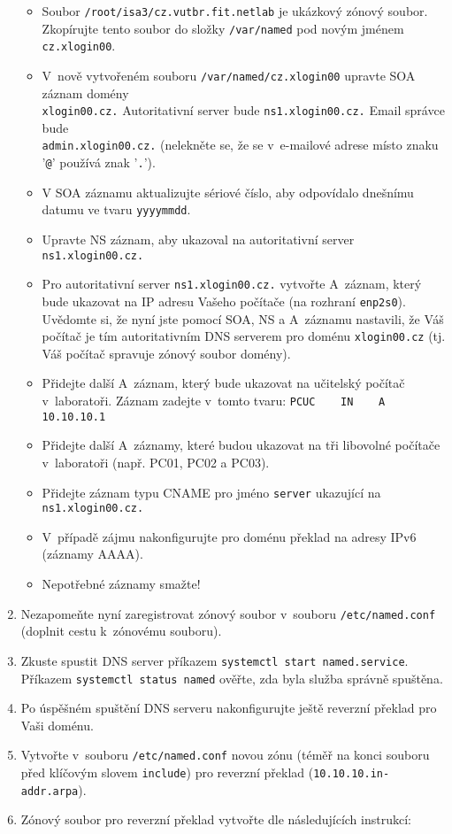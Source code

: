 \begin{enumerate}
    \begin{itemize}
      \item Soubor {\tt /root/isa3/cz.vutbr.fit.netlab} je ukázkový zónový soubor.\\
            Zkopírujte tento soubor do složky {\tt /var/named} pod novým jménem {\tt cz.xlogin00}.
      \item V~nově vytvořeném souboru {\tt /var/named/cz.xlogin00} upravte SOA záznam domény\\ {\tt xlogin00.cz.} Autoritativní server bude {\tt ns1.xlogin00.cz.}
            Email správce bude\\ {\tt admin.xlogin00.cz.} (nelekněte se, že se v~e-mailové adrese místo znaku '{\tt @}' používá znak '{\tt .}').
      \item V SOA záznamu aktualizujte sériové číslo, aby odpovídalo dnešnímu datumu ve tvaru {\tt yyyymmdd}.
      \item Upravte NS záznam, aby ukazoval na autoritativní server {\tt ns1.xlogin00.cz.}
      \item Pro autoritativní server {\tt ns1.xlogin00.cz.} vytvořte A~záznam, který bude ukazovat na IP adresu Vašeho počítače (na rozhraní {\tt enp2s0}).
            Uvědomte si, že nyní jste pomocí SOA, NS a A~záznamu nastavili, že Váš počítač je tím autoritativním DNS serverem pro doménu {\tt xlogin00.cz} (tj. Váš počítač spravuje zónový soubor domény).
      \item Přidejte další A~záznam, který bude ukazovat na učitelský počítač v~laboratoři. Záznam zadejte v~tomto tvaru:
            \verb|PCUC    IN    A    10.10.10.1|
      \item Přidejte další A~záznamy, které budou ukazovat na tři libovolné počítače v~laboratoři (např. PC01, PC02 a PC03).
      \item Přidejte záznam typu CNAME pro jméno {\tt server} ukazující na {\tt ns1.xlogin00.cz.}
      \item V~případě zájmu nakonfigurujte pro doménu překlad na adresy IPv6 (záznamy AAAA).
      \item Nepotřebné záznamy smažte!
    \end{itemize}

  \item Nezapomeňte nyní zaregistrovat zónový soubor v~souboru {\tt /etc/named.conf} (doplnit cestu k~zónovému souboru).
  \item Zkuste spustit DNS server příkazem {\tt systemctl start named.service}.
    Příkazem {\tt systemctl status named} ověřte, zda byla služba správně spuštěna.
  \item Po úspěšném spuštění DNS serveru nakonfigurujte ještě reverzní překlad pro Vaši doménu.
  \item Vytvořte v~souboru {\tt /etc/named.conf} novou zónu (téměř na konci souboru před klíčovým slovem {\tt include}) pro reverzní překlad ({\tt 10.10.10.in-addr.arpa}).
  \item Zónový soubor pro reverzní překlad vytvořte dle následujících instrukcí:
  

\end{enumerate}
